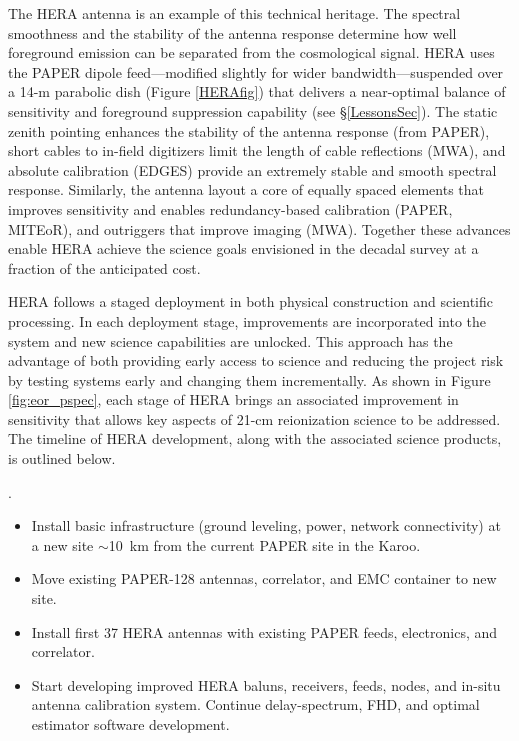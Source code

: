 \documentclass[preprint]{aastex}
\begin{document}

The HERA antenna is an example of this technical heritage. The spectral
smoothness and the stability of the antenna response determine how well
foreground emission can be separated from the cosmological signal.
HERA uses the PAPER dipole feed---modified slightly for wider
bandwidth---suspended over a 14-m parabolic dish (Figure \ref{HERAfig}) that
delivers a near-optimal balance of sensitivity and foreground suppression capability (see \S\ref{LessonsSec}).
The static zenith pointing enhances the stability of the antenna response
(from PAPER), short cables to in-field digitizers limit the length of cable
reflections (MWA), and absolute calibration (EDGES) provide
an extremely stable and smooth spectral response. Similarly, the antenna layout
a core of equally spaced elements that improves sensitivity
and enables redundancy-based calibration (PAPER, MITEoR), and 
outriggers that improve imaging (MWA).
Together
these advances enable HERA achieve the science goals envisioned in the decadal
survey at a fraction of the anticipated cost. 

HERA follows a staged deployment in both physical construction and scientific processing.  In
each deployment stage, improvements are incorporated into the system and new
science capabilities are unlocked.  
This approach has the advantage of both
providing early access to science and reducing the project risk by testing systems
early and changing them incrementally.  As shown in Figure \ref{fig:eor_pspec}, each
stage of HERA brings an associated improvement in sensitivity that allows key
aspects of 21-cm reionization science to be addressed.  
The timeline of HERA
development, along with the associated science products, is outlined below. 

.  
\begin{itemize}\setlength{\parskip}{0pt}\itemsep0pt
\vspace{-7pt}
  \item Install basic infrastructure (ground leveling, power, network connectivity) at a new site $\sim$10~km from 
the current PAPER site in the Karoo.
  \item Move existing PAPER-128 antennas, correlator, and EMC container to new site.
  \item Install first 37 HERA antennas with existing PAPER feeds, electronics, and correlator. 
  \item Start developing improved HERA baluns, receivers, feeds, 
nodes, and in-situ antenna calibration system.
Continue delay-spectrum, FHD, 
and optimal estimator software development.
\end{itemize}
\end{document}
